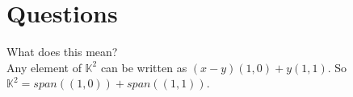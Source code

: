 \documentclass{article}
\begin{document}
\section{Questions}

\begin{framed}
    What does this mean?\\
    Any element of $\mathbb{K}^{2}$ can be written as $(x-y)(1,0) + y(1,1)$. So $\mathbb{K}^{2}=span((1,0))+span((1,1))$.
\end{framed}
\end{document}
